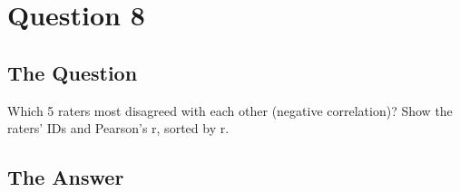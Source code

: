 \section{Question 8}

\subsection{The Question}

\begin{flushleft}

Which 5 raters most disagreed with each other (negative
correlation)? Show the raters' IDs and Pearson's r, sorted by r.


\end{flushleft}
\subsection{The Answer}


